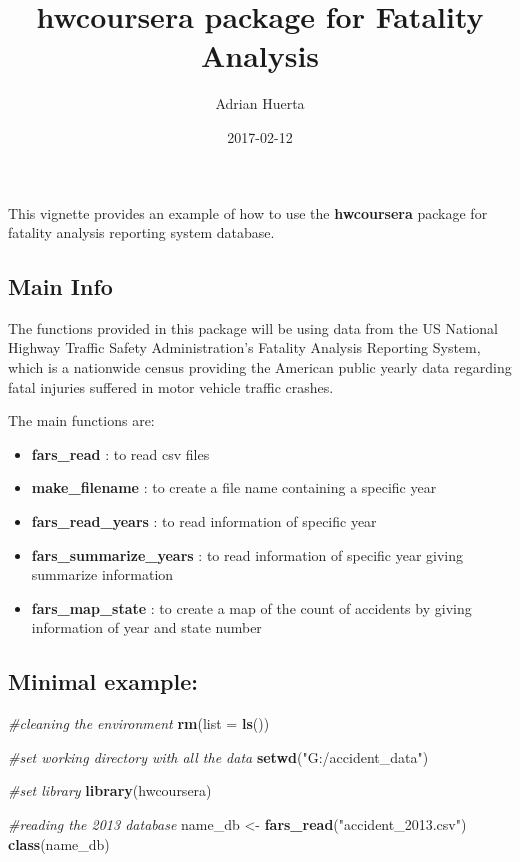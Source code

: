 \documentclass[]{article}
\title{hwcoursera package for Fatality Analysis}
\author{Adrian Huerta}
\date{2017-02-12}
\newenvironment{Shaded}{\begin{snugshade}}{\end{snugshade}}
\newcommand{\KeywordTok}[1]{\textcolor[rgb]{0.13,0.29,0.53}{\textbf{{#1}}}}
\newcommand{\DataTypeTok}[1]{\textcolor[rgb]{0.13,0.29,0.53}{{#1}}}
\newcommand{\StringTok}[1]{\textcolor[rgb]{0.31,0.60,0.02}{{#1}}}
\newcommand{\CommentTok}[1]{\textcolor[rgb]{0.56,0.35,0.01}{\textit{{#1}}}}
\newcommand{\NormalTok}[1]{{#1}}
\providecommand{\tightlist}{%
  \setlength{\itemsep}{0pt}\setlength{\parskip}{0pt}}
\begin{document}
\maketitle

This vignette provides an example of how to use the \textbf{hwcoursera}
package for fatality analysis reporting system database.

\subsection{Main Info}\label{main-info}

The functions provided in this package will be using data from the US
National Highway Traffic Safety Administration's Fatality Analysis
Reporting System, which is a nationwide census providing the American
public yearly data regarding fatal injuries suffered in motor vehicle
traffic crashes.

The main functions are:

\begin{itemize}
\tightlist
\item
  \textbf{fars\_read} : to read csv files
\item
  \textbf{make\_filename} : to create a file name containing a specific
  year
\item
  \textbf{fars\_read\_years} : to read information of specific year
\item
  \textbf{fars\_summarize\_years} : to read information of specific year
  giving summarize information
\item
  \textbf{fars\_map\_state} : to create a map of the count of accidents
  by giving information of year and state number
\end{itemize}

\subsection{Minimal example:}\label{minimal-example}

\begin{Shaded}
\begin{Highlighting}[]
\CommentTok{#cleaning the environment}
\KeywordTok{rm}\NormalTok{(}\DataTypeTok{list =} \KeywordTok{ls}\NormalTok{()) }

\CommentTok{#set working directory with all the data}
\KeywordTok{setwd}\NormalTok{(}\StringTok{"G:/accident_data"}\NormalTok{)}

\CommentTok{#set library}
\KeywordTok{library}\NormalTok{(hwcoursera)}

\CommentTok{#reading the 2013 database}
\NormalTok{name_db <-}\StringTok{ }\KeywordTok{fars_read}\NormalTok{(}\StringTok{"accident_2013.csv"}\NormalTok{)}
\KeywordTok{class}\NormalTok{(name_db)}
\end{Highlighting}
\end{Shaded}
\end{document}
